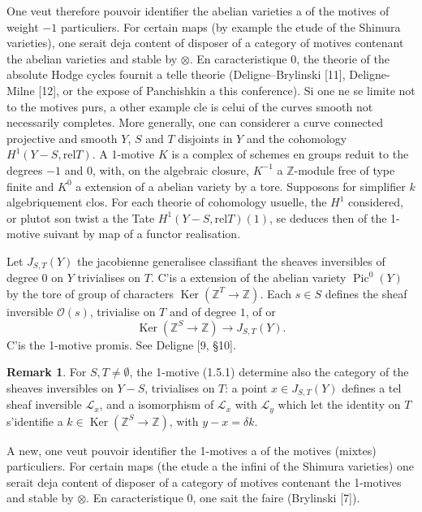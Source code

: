 \documentclass[11pt,a4paper]{article}
\theoremstyle{plain}
\theoremstyle{definition}
\newtheorem{remark}[theorem]{Remark}
\DeclareMathOperator{\Ker}{Ker}
\DeclareMathOperator{\Pic}{Pic}
\newcommand{\Z}{\mathbb{Z}}
\newcommand{\rel}{\mathrm{rel}}
\begin{document}
One veut therefore pouvoir identifier the abelian varieties a of the motives of weight $-1$ particuliers. For certain maps (by example the etude of the Shimura varieties), one serait deja content of disposer of a category of motives contenant the abelian varieties and stable by $\otimes$. En caracteristique $0$, the theorie of the absolute Hodge cycles fournit a telle theorie (Deligne--Brylinski [11], Deligne-Milne [12], or the expose of Panchishkin a this conference). Si one ne se limite not to the motives purs, a other example cle is celui of the curves smooth not necessarily completes. More generally, one can considerer a curve connected projective and smooth $Y$, $S$ and $T$ disjoints in $Y$ and the cohomology $H^1(Y - S, \rel T)$. A 1-motive $K$ is a complex of schemes en groups reduit to the degrees $-1$ and $0$, with, on the algebraic closure, $K^{-1}$ a $\Z$-module free of type finite and $K^0$ a extension of a abelian variety by a tore. Supposons for simplifier $k$ algebriquement clos. For each theorie of cohomology usuelle, the $H^1$ considered, or plutot son twist a the Tate $H^1(Y - S, \rel T)(1)$, se deduces then of the 1-motive suivant by map of a functor realisation.

Let $J_{S,T}(Y)$ the jacobienne generalisee classifiant the sheaves inversibles of degree $0$ on $Y$ trivialises on $T$. C'is a extension of the abelian variety $\Pic^0(Y)$ by the tore of group of characters $\Ker(\Z^T \to \Z)$. Each $s \in S$ defines the sheaf inversible $\mathcal{O}(s)$, trivialise on $T$ and of degree $1$, of or
\begin{equation}
\Ker(\Z^S \to \Z) \to J_{S,T}(Y).
\tag{1.5.1}
\end{equation}
C'is the 1-motive promis. See Deligne [9, \S10].

\begin{remark}
For $S, T \neq \emptyset$, the 1-motive (1.5.1) determine also the category of the sheaves inversibles on $Y - S$, trivialises on $T$: a point $x \in J_{S,T}(Y)$ defines a tel sheaf inversible $\mathcal{L}_x$, and a isomorphism of $\mathcal{L}_x$ with $\mathcal{L}_y$ which let the identity on $T$ s'identifie a $k \in \Ker(\Z^S \to \Z)$, with $y - x = \delta k$.
\end{remark}

A new, one veut pouvoir identifier the 1-motives a of the motives (mixtes) particuliers. For certain maps (the etude a the infini of the Shimura varieties) one serait deja content of disposer of a category of motives contenant the 1-motives and stable by $\otimes$. En caracteristique $0$, one sait the faire (Brylinski [7]).
\end{document}

